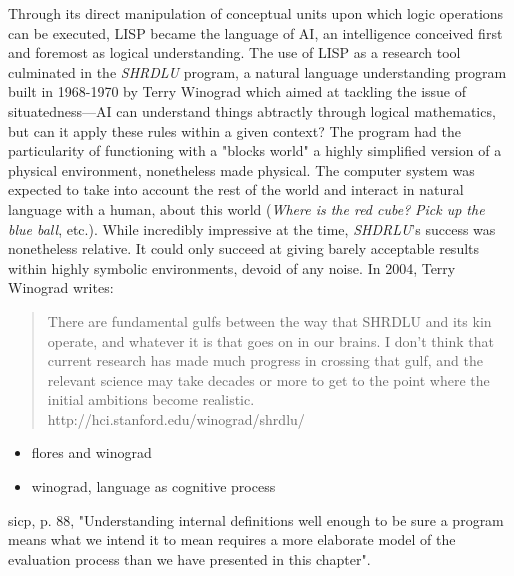 Through its direct manipulation of conceptual units upon which logic operations can be executed, LISP became the language of AI, an intelligence conceived first and foremost as logical understanding. The use of LISP as a research tool culminated in the \emph{SHRDLU} program, a natural language understanding program built in 1968-1970 by Terry Winograd which aimed at tackling the issue of situatedness—AI can understand things abtractly through logical mathematics, but can it apply these rules within a given context? The program had the particularity of functioning with a "blocks world" a highly simplified version of a physical environment, nonetheless made physical. The computer system was expected to take into account the rest of the world and interact in natural language with a human, about this world (\emph{Where is the red cube?} \emph{Pick up the blue ball}, etc.). While incredibly impressive at the time, \emph{SHDRLU}'s success was nonetheless relative. It could only succeed at giving barely acceptable results within highly symbolic environments, devoid of any noise. In 2004, Terry Winograd writes:

\begin{quote}
    There are fundamental gulfs between the way that SHRDLU and its kin operate, and whatever it is that goes on in our brains. I don’t think that current research has made much progress in crossing that gulf, and the relevant science may take decades or more to get to the point where the initial ambitions become realistic. http://hci.stanford.edu/winograd/shrdlu/
\end{quote}



\begin{itemize}
    \item flores and winograd
    \item winograd, language as cognitive process
\end{itemize}




sicp,  p. 88, "Understanding internal definitions well enough to be sure a program means what we intend it to mean requires a more elaborate model of the evaluation process than we have presented in this chapter".


